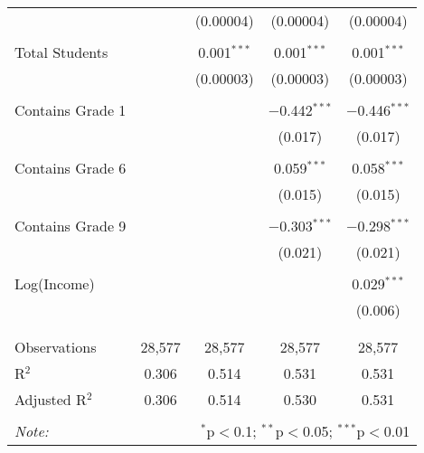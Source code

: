 \begin{table}[!htbp]
\begin{tabular}{@{\extracolsep{-2pt}}lcccc}
  &  & (0.00004) & (0.00004) & (0.00004) \\ 
  & & & & \\ 
 Total Students &  & 0.001$^{***}$ & 0.001$^{***}$ & 0.001$^{***}$ \\ 
  &  & (0.00003) & (0.00003) & (0.00003) \\ 
  & & & & \\ 
 Contains Grade 1 &  &  & $-$0.442$^{***}$ & $-$0.446$^{***}$ \\ 
  &  &  & (0.017) & (0.017) \\ 
  & & & & \\ 
 Contains Grade 6 &  &  & 0.059$^{***}$ & 0.058$^{***}$ \\ 
  &  &  & (0.015) & (0.015) \\ 
  & & & & \\ 
 Contains Grade 9 &  &  & $-$0.303$^{***}$ & $-$0.298$^{***}$ \\ 
  &  &  & (0.021) & (0.021) \\ 
  & & & & \\ 
 Log(Income) &  &  &  & 0.029$^{***}$ \\ 
  &  &  &  & (0.006) \\ 
  & & & & \\ 
\hline \\[-1.8ex] 
Observations & 28,577 & 28,577 & 28,577 & 28,577 \\ 
R$^{2}$ & 0.306 & 0.514 & 0.531 & 0.531 \\ 
Adjusted R$^{2}$ & 0.306 & 0.514 & 0.530 & 0.531 \\ 
\hline 
\hline \\[-1.8ex] 
\textit{Note:}  & \multicolumn{4}{r}{$^{*}$p$<$0.1; $^{**}$p$<$0.05; $^{***}$p$<$0.01} \\ 
\end{tabular} 
\end{table} 
